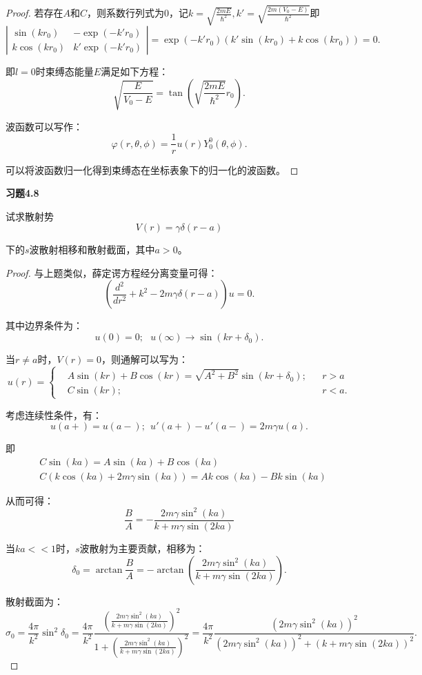 \documentclass[reqno,a4paper,12pt]{amsart}
\begin{document}
\begin{proof}
若存在$A$和$C$，则系数行列式为$0$，记$k=\sqrt{\frac{2mE}{\hbar^2}}, k' = \sqrt{\frac{2m(V_0-E)}{\hbar^2}}$即
\[
	\left\vert \begin{matrix}
		\sin(kr_0) & -\exp(-k'r_0) \\
		k\cos(kr_0) & k'\exp(-k'r_0)
	\end{matrix} \right\vert = \exp(-k'r_0) (k'\sin(kr_0) + k\cos(kr_0)) = 0.
\]

即$l=0$时束缚态能量$E$满足如下方程：
\[
	\sqrt{\frac{E}{V_0-E}} = \tan\left(\sqrt{\frac{2mE}{\hbar^2}}r_0\right).
\]

波函数可以写作：
\[
	\varphi (r,\theta, \phi) = \frac{1}{r}u(r) Y_0^0(\theta, \phi).
\]

可以将波函数归一化得到束缚态在坐标表象下的归一化的波函数。
\end{proof}

\medskip

\textbf{习题4.8}

试求散射势
\[
	V(r) = \gamma\delta(r-a)
\]

下的$s$波散射相移和散射截面，其中$a>0$。

\begin{proof}
与上题类似，薛定谔方程经分离变量可得：
\[
	\left( \frac{d^2}{dr^2} + k^2 - 2m\gamma \delta(r-a) \right)u = 0.
\]

其中边界条件为：
\[
	u(0) = 0; \ \ \ u(\infty) \to \sin(kr+\delta_0).
\]

当$r\neq a$时，$V(r) = 0$，则通解可以写为：
\[
	u(r) = \left\{ \begin{aligned}
		&A\sin(kr) + B\cos(kr) = \sqrt{A^2+B^2} \sin(kr+\delta_0); && r>a \\
		&C\sin(kr); && r<a.
	\end{aligned} \right.
\]

考虑连续性条件，有：
\[
	u(a+) = u(a-); \ \ u'(a+)-u'(a-) = 2m\gamma u(a).
\]

即
\begin{align*}
	&C\sin(ka) = A\sin(ka)+B\cos(ka) \\
	&C(k\cos(ka)+2m\gamma\sin(ka)) = Ak\cos(ka) - Bk\sin(ka)
\end{align*}

从而可得：
\[
	\frac{B}{A} = -\frac{2m\gamma \sin^2(ka)}{k+m\gamma\sin(2ka)}
\]

当$ka<<1$时，$s$波散射为主要贡献，相移为：
\[
	\delta_0 = \arctan\frac{B}{A} = -\arctan \left(\frac{2m\gamma \sin^2(ka)}{k+m\gamma\sin(2ka)} \right).
\]

散射截面为：
\[
	\sigma_0 = \frac{4\pi}{k^2}\sin^2\delta_0 = \frac{4\pi}{k^2} \frac{\left(\frac{2m\gamma \sin^2(ka)}{k+m\gamma\sin(2ka)} \right)^2}{1+\left(\frac{2m\gamma \sin^2(ka)}{k+m\gamma\sin(2ka)} \right)^2} = \frac{4\pi}{k^2} \frac{\left(2m\gamma \sin^2(ka)\right)^2}{\left(2m\gamma \sin^2(ka)\right)^2 + \left( k+m\gamma\sin(2ka) \right)^2}.
\]
\end{proof}
\end{document}
